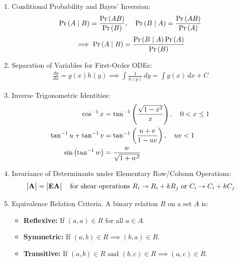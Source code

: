 \begin{enumerate}[label=\thesubsection.\arabic*, ref=\thesubsection.\theenumi]
		\item Conditional Probability and Bayes' Inversion:
		\begin{align}
			\Pr\left(A \mid B\right) = \frac{\Pr\left(AB\right)}{\Pr\left(B\right)}, \quad \Pr\left(B \mid A\right) = \frac{\Pr\left(AB\right)}{\Pr\left(A\right)} \label{eq:CBSE12-2019-cond_prob}
		\end{align}
		\begin{align}
			\implies \Pr\left(A \mid B\right) = \frac{\Pr\left(B \mid A\right)\Pr\left(A\right)}{\Pr\left(B\right)} \label{eq:CBSE12-2019-bayes_two_events}
		\end{align}
		
		\item Separation of Variables for First-Order ODEs:
		\begin{align}
			\frac{dy}{dx} = g(x)h(y) \implies \int \frac{1}{h(y)} \, dy = \int g(x) \, dx + C \label{eq:CBSE12-2019-sep_vars}
		\end{align}
		
		\item Inverse Trigonometric Identities:
		\begin{align}
			\cos^{-1} x &= \tan^{-1}\left(\frac{\sqrt{1 - x^2}}{x}\right), \quad 0 < x \le 1 \label{eq:CBSE12-2019-arccos_to_arctan} \\
			\tan^{-1} u + \tan^{-1} v &= \tan^{-1}\left(\frac{u + v}{1 - uv}\right), \quad uv < 1 \label{eq:CBSE12-2019-arctan_add} \\
			\sin\left(\tan^{-1} w\right) &= \frac{w}{\sqrt{1 + w^2}} \label{eq:CBSE12-2019-sin_arctan}
		\end{align}
		
		\item Invariance of Determinants under Elementary Row/Column Operations:
		\begin{align}
			\begin{vmatrix}\mathbf{A}\end{vmatrix} = \begin{vmatrix}\mathbf{E}\mathbf{A}\end{vmatrix} \quad \text{for shear operations } R_i \to R_i + k R_j \text{ or } C_i \to C_i + k C_j \label{eq:CBSE12-2019-det_shear_invariance}
		\end{align}
		
		\item Equivalence Relation Criteria.
		A binary relation $R$ on a set $A$ is:
		\begin{itemize}
			\item \textbf{Reflexive:} If $(a, a) \in R$ for all $a \in A$.
			\item \textbf{Symmetric:} If $(a, b) \in R \implies (b, a) \in R$.
			\item \textbf{Transitive:} If $(a, b) \in R$ and $(b, c) \in R \implies (a, c) \in R$.
		\end{itemize}
		

\end{enumerate}
